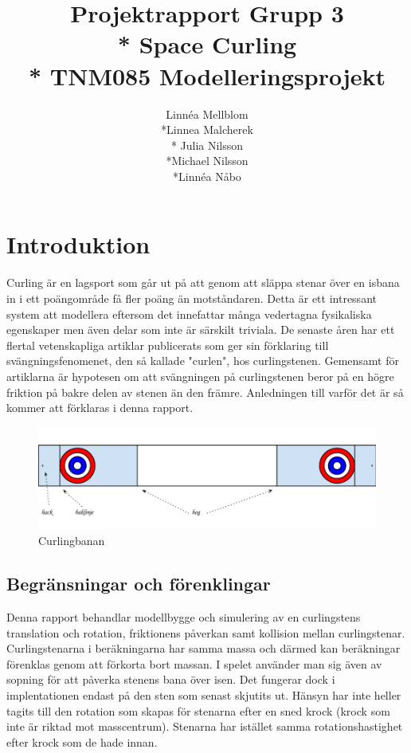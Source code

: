 \documentclass[11pt]{article} %
\title{Projektrapport Grupp 3 \\* 
Space Curling\\*
TNM085 Modelleringsprojekt}
\author{Linnéa Mellblom\\*Linnea Malcherek\\* Julia Nilsson\\*Michael Nilsson\\*Linnéa Nåbo}
\begin{document}
\maketitle
\pagebreak
{}  

\pagebreak
\tableofcontents
\pagebreak

\section{Introduktion}
Curling är en lagsport som går ut på att genom att släppa stenar över en isbana in i ett poängområde få fler poäng än motståndaren. 
Detta är ett intressant system att modellera eftersom det innefattar många vedertagna fysikaliska egenskaper men även delar som inte är särskilt triviala. 
De senaste åren har ett flertal vetenskapliga artiklar publicerats som ger sin förklaring till svängningsfenomenet, den så kallade "curlen", hos curlingstenen.
Gemensamt för artiklarna är hypotesen om att svängningen på curlingstenen beror på en högre friktion på bakre delen av stenen än den främre. 
Anledningen till varför det är så kommer att förklaras i denna rapport.

\begin{figure}[ht!]
\centering
\includegraphics[width=140mm]{bana.png}
\caption{Curlingbanan}
\label{fig:bana}
\label{overflow}
\end{figure}

\subsection{Begränsningar och förenklingar} 
Denna rapport behandlar modellbygge och simulering av en curlingstens translation
och rotation, friktionens påverkan samt kollision mellan curlingstenar. 
Curlingstenarna i beräkningarna har samma massa och därmed kan beräkningar förenklas genom att
förkorta bort massan. 
I spelet använder man sig även av sopning för att påverka stenens
bana över isen. 
Det fungerar dock i implentationen endast på den sten som senast skjutits ut. 
Hänsyn har inte heller tagits till den rotation som skapas för stenarna efter en sned krock (krock som
inte är riktad mot masscentrum). Stenarna har istället samma rotationshastighet efter
krock som de hade innan.
\end{document}
